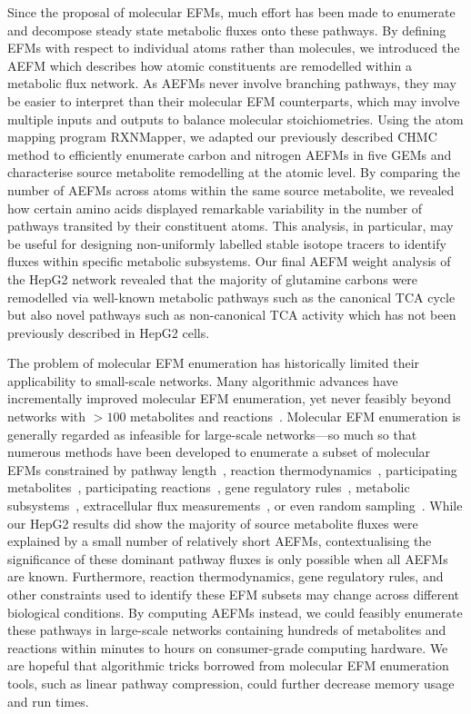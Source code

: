 \documentclass[12pt]{article}
\begin{document}
Since the proposal of molecular EFMs, much effort has been made to
enumerate and decompose steady state metabolic fluxes onto these pathways.
By defining EFMs with respect to individual atoms rather than molecules,
we introduced the AEFM which describes how atomic constituents are
remodelled within a metabolic flux network. As AEFMs never involve
branching pathways, they may be easier to interpret than their molecular
EFM counterparts, which may involve multiple inputs and outputs to balance
molecular stoichiometries. Using the atom mapping program RXNMapper, we
adapted our previously described CHMC method to efficiently enumerate
carbon and nitrogen AEFMs in five GEMs and characterise source metabolite
remodelling at the atomic level. By comparing the number of AEFMs across
atoms within the same source metabolite, we revealed how certain amino
acids displayed remarkable variability in the number of pathways transited
by their constituent atoms. This analysis, in particular, may be useful
for designing non-uniformly labelled stable isotope tracers to identify
fluxes within specific metabolic subsystems. Our final AEFM weight
analysis of the HepG2 network revealed that the majority of glutamine
carbons were remodelled via well-known metabolic pathways such as the
canonical TCA cycle but also novel pathways such as non-canonical TCA
activity which has not been previously described in HepG2 cells.

The problem of molecular EFM enumeration has historically limited their
applicability to small-scale networks. Many algorithmic advances have
incrementally improved molecular EFM enumeration, yet never feasibly
beyond networks with $>100$ metabolites and
reactions~\citep{KampAxelvon2006M5fa,TerzerMarco2008Lcoe,vanKlinkenJanBert2016Faet}.
Molecular EFM enumeration is generally regarded as infeasible for
large-scale networks---so much so that numerous methods have been
developed to enumerate a subset of molecular EFMs constrained by pathway
length~\citep{deFigueiredoLuisF2009Ctse}, reaction
thermodynamics~\citep{GerstlMatthiasP2015Mief}, participating
metabolites~\citep{PeyJon2014Dcoe}, participating
reactions~\citep{KaletaChristoph2009Ctwb}, gene regulatory
rules~\citep{JungreuthmayerChristian2013rSue}, metabolic
subsystems~\citep{SchusterS2002Etps,SchwartzJean-Marc2007Omfa},
extracellular flux
measurements~\citep{SoonsZitaITA2011Iomm,JungersRaphaelM.2011Fcom}, or
even random sampling~\citep{MachadoDaniel2012Rsoe}. While our HepG2
results did show the majority of source metabolite fluxes were explained
by a small number of relatively short AEFMs, contextualising the
significance of these dominant pathway fluxes is only possible when all
AEFMs are known. Furthermore, reaction thermodynamics, gene regulatory
rules, and other constraints used to identify these EFM subsets may change
across different biological conditions. By computing AEFMs instead, we
could feasibly enumerate these pathways in large-scale networks containing
hundreds of metabolites and reactions within minutes to hours on
consumer-grade computing hardware. We are hopeful that algorithmic tricks
borrowed from molecular EFM enumeration tools, such as linear pathway
compression, could further decrease memory usage and run times.
\end{document}
